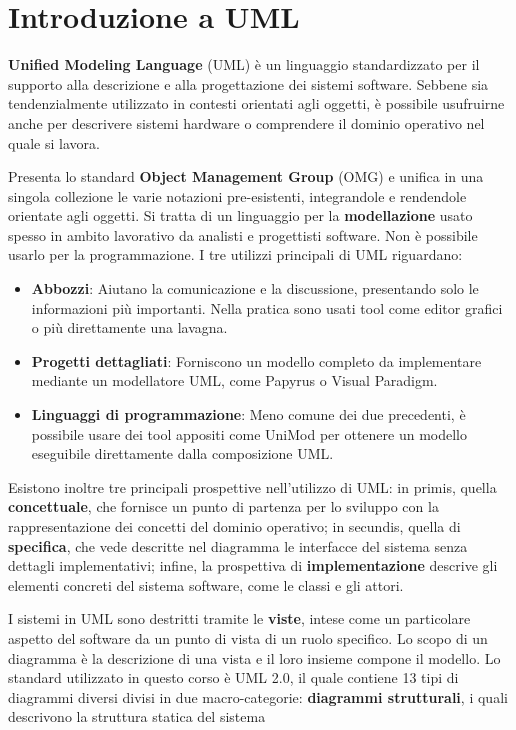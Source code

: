 \section{Introduzione a UML}
\textbf{Unified Modeling Language} (UML) è un linguaggio standardizzato per il supporto alla descrizione e alla progettazione dei sistemi software.
Sebbene sia tendenzialmente utilizzato in contesti orientati agli oggetti, è possibile usufruirne anche per descrivere sistemi hardware o comprendere il
dominio operativo nel quale si lavora.\par
Presenta lo standard \textbf{Object Management Group} (OMG) e unifica in una singola collezione le varie notazioni pre-esistenti, integrandole e
rendendole orientate agli oggetti. Si tratta di un linguaggio per la \textbf{modellazione} usato spesso in ambito lavorativo da analisti e progettisti
software. Non è possibile usarlo per la programmazione. I tre utilizzi principali di UML riguardano: \begin{itemize}
	\item \textbf{Abbozzi}: Aiutano la comunicazione e la discussione, presentando solo le informazioni più importanti. Nella pratica sono usati tool
	come editor grafici o più direttamente una lavagna.
	\item \textbf{Progetti dettagliati}: Forniscono un modello completo da implementare mediante un modellatore UML, come Papyrus o Visual Paradigm.
	\item \textbf{Linguaggi di programmazione}: Meno comune dei due precedenti, è possibile usare dei tool appositi come UniMod per ottenere un modello
	eseguibile direttamente dalla composizione UML.
\end{itemize}
\noindent Esistono inoltre tre principali prospettive nell'utilizzo di UML: in primis, quella \textbf{concettuale}, che fornisce un punto di partenza
per lo sviluppo con la rappresentazione dei concetti del dominio operativo; in secundis, quella di \textbf{specifica}, che vede descritte nel diagramma
le interfacce del sistema senza dettagli implementativi; infine, la prospettiva di \textbf{implementazione} descrive gli elementi concreti del sistema
software, come le classi e gli attori.\par
I sistemi in UML sono destritti tramite le \textbf{viste}, intese come un particolare aspetto del software da un punto di vista di un ruolo specifico.
Lo scopo di un diagramma è la descrizione di una vista e il loro insieme compone il modello. Lo standard utilizzato in questo corso è UML 2.0, il quale
contiene 13 tipi di diagrammi diversi divisi in due macro-categorie: \textbf{diagrammi strutturali}, i quali descrivono la struttura statica del sistema
